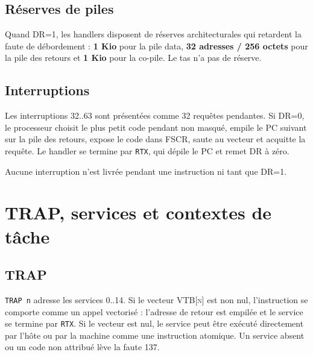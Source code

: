\documentclass[10pt,a4paper,twoside,openany]{book}
\newcommand{\reg}[1]{\textsc{#1}}
\begin{document}
\section{Réserves de piles}
Quand \reg{DR=1}, les handlers disposent de réserves architecturales qui retardent la faute de débordement : \textbf{1 Kio} pour la pile data, \textbf{32 adresses / 256 octets} pour la pile des retours et \textbf{1 Kio} pour la co-pile. Le tas n'a pas de réserve.

\section{Interruptions}
Les interruptions 32..63 sont présentées comme 32 requêtes pendantes. Si \reg{DR=0}, le processeur choisit le plus petit code pendant non masqué, empile le PC suivant sur la pile des retours, expose le code dans \reg{FSCR}, saute au vecteur et acquitte la requête. Le handler se termine par \texttt{RTX}, qui dépile le PC et remet \reg{DR} à zéro.

Aucune interruption n'est livrée pendant une instruction ni tant que \reg{DR=1}.

\chapter{TRAP, services et contextes de tâche}
\section{TRAP}
\texttt{TRAP n} adresse les services 0..14. Si le vecteur \reg{VTB[n]} est non nul, l'instruction se comporte comme un appel vectorisé : l'adresse de retour est empilée et le service se termine par \texttt{RTX}. Si le vecteur est nul, le service peut être exécuté directement par l'hôte ou par la machine comme une instruction atomique. Un service absent ou un code non attribué lève la faute 137.
\end{document}
